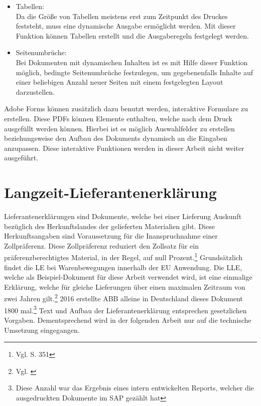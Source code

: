 \begin{itemize}
	\item Tabellen: \\
		Da die Größe von Tabellen meistens erst zum Zeitpunkt des Druckes feststeht, muss eine dynamische Ausgabe ermöglicht werden. Mit dieser Funktion können Tabellen erstellt und die Ausgaberegeln festgelegt werden.
	\item Seitenumbrüche: \\
		Bei Dokumenten mit dynamischen Inhalten ist es mit Hilfe dieser Funktion möglich, bedingte Seitenumbrüche festzulegen, um gegebenenfalls Inhalte auf einer beliebigen Anzahl neuer Seiten mit einem festgelegten Layout darzustellen.
\end{itemize} 
       
Adobe Forms können zusätzlich dazu benutzt werden, interaktive Formulare zu erstellen. Diese \ac{PDF}s können Elemente enthalten, welche nach dem Druck ausgefüllt werden können. Hierbei ist es möglich Auswahlfelder zu erstellen beziehungsweise den Aufbau des Dokuments dynamisch an die Eingaben anzupassen. Diese interaktive Funktionen werden in dieser Arbeit nicht weiter ausgeführt.
\FloatBarrier
\section{Langzeit-Lieferantenerklärung}
\label{LLE}

 Lieferantenerklärungen sind Dokumente, welche bei einer Lieferung Auskunft bezüglich des Herkunftslandes der gelieferten Materialien gibt. Diese Herkunftsangaben sind Voraussetzung für die Inanspruchnahme einer Zollpräferenz. Diese Zollpräferenz reduziert den Zollsatz für ein präferenzberechtigtes Material, in der Regel, auf null Prozent.\footnote{Vgl. \cite{Schnellenbach.2015} S. 351} Grundsätzlich findet die \ac{LE} bei Warenbewegungen innerhalb der \ac{EU} Anwendung. Die \ac{LLE}, welche als Beispiel-Dokument für diese Arbeit verwendet wird, ist eine einmalige Erklärung, welche für gleiche Lieferungen über einen maximalen Zeitraum von zwei Jahren gilt.\footnote{Vgl. \cite{ZOLL.2017}} 2016 erstellte ABB alleine in Deutschland dieses Dokument 1800 mal.\footnote{Diese Anzahl war das Ergebnis eines intern entwickelten Reports, welcher die ausgedruckten Dokumente im SAP gezählt hat} Text und Aufbau der Lieferantenerklärung entsprechen gesetzlichen Vorgaben. Dementsprechend wird in der folgenden Arbeit nur auf die technische Umsetzung eingegangen.
